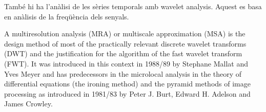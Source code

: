 
També hi ha l'anàlisi de les sèries temporals amb wavelet analysis. Aquest es basa en anàlisis de la freqüència dels senyals. 

A multiresolution analysis (MRA) or multiscale approximation (MSA) is the design method of most of the practically relevant discrete wavelet transforms (DWT) and the justification for the algorithm of the fast wavelet transform (FWT). It was introduced in this context in 1988/89 by Stephane Mallat and Yves Meyer and has predecessors in the microlocal analysis in the theory of differential equations (the ironing method) and the pyramid methods of image processing as introduced in 1981/83 by Peter J. Burt, Edward H. Adelson and James Crowley.










